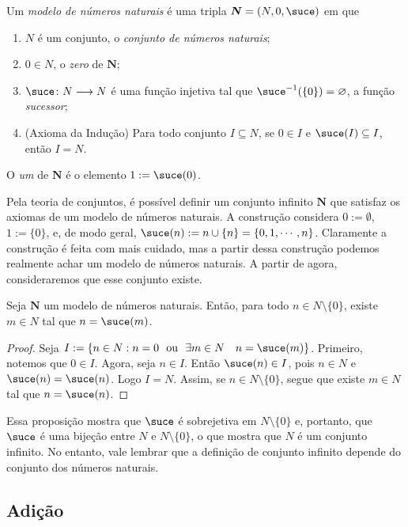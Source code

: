 \begin{defi}
	Um \emph{modelo de números naturais} é uma tripla $\bm N = (N,0,\suce)$ em que 
	\begin{enumerate}
	\item $N$ é um conjunto, o \emph{conjunto de números naturais};
	\item $0 \in N$, o \emph{zero} de $\bm N$;
	\item $\suce\colon N \to N$ é uma função injetiva tal que $\suce\inv(\{0\})=\emptyset$, a função \emph{sucessor};
	\item (Axioma da Indução) Para todo conjunto $I \subseteq N$, se $0 \in I$ e $\suce(I) \subseteq I$, então $I=N$.
	\end{enumerate}
O \emph{um} de $\bm N$ é o elemento $1 := \suce(0)$.
\end{defi}

Pela teoria de conjuntos, é possível definir um conjunto infinito $\bm N$ que satisfaz os axiomas de um modelo de números naturais. A construção considera $0 := \emptyset$, $1 := \{0\}$, e, de modo geral, $\suce(n) := n \cup \{n\} = \{0,1,\cdots,n\}$. Claramente a construção é feita com mais cuidado, mas a partir dessa construção podemos realmente achar um modelo de números naturais. A partir de agora, consideraremos que esse conjunto existe.

\begin{prop}
	Seja $\bm N$ um  modelo de números naturais. Então, para todo $n \in N\setminus \{0\}$, existe $m \in N$ tal que $n=\suce(m)$.
\end{prop}
\begin{proof}
	Seja $I := \{n \in N:n=0 \ou \exists m \in N \quad n=\suce(m)\}$. Primeiro, notemos que $0 \in I$. Agora, seja $n \in I$. Então $\suce(n) \in I$, pois $n \in N$ e $\suce(n)=\suce(n)$. Logo $I=N$. Assim, se $n \in N \setminus \{0\}$, segue que existe $m \in N$ tal que $n=\suce(n)$.
\end{proof}

Essa proposição mostra que $\suce$ é sobrejetiva em $N \setminus \{0\}$ e, portanto, que $\suce$ é uma bijeção entre $N$ e $N \setminus \{0\}$, o que mostra que $N$ é um conjunto infinito. No entanto, vale lembrar que a definição de conjunto infinito depende do conjunto dos números naturais.

\subsection{Adição}


